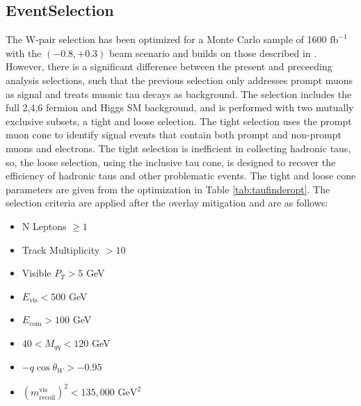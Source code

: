 \subsection{EventSelection}
\label{subsec:EventSelection}
The W-pair selection has been optimized for a Monte Carlo sample of 1600 $\text{fb}^{-1}$ with the $(-0.8,+0.3)$ beam scenario and builds on those described in \cite{ivan}. However, there is a significant difference between the present and preceeding analysis selections, such that  the previous selection only addresses prompt muons as signal and treats muonic tau decays as background. The selection includes the full 2,4,6 fermion and Higgs SM background, and is performed with two mutually exclusive subsets, a tight and loose selection. The tight selection uses the prompt muon cone to identify signal events that contain both prompt and non-prompt muons and electrons. The tight selection is inefficient in collecting hadronic taus, so, the loose selection, using the inclusive tau cone, is designed to recover the efficiency of hadronic taus and other problematic events. The tight and loose cone parameters are given from the optimization in Table \ref{tab:taufinderopt}. The selection criteria are applied after the overlay mitigation and are as follows:
\begin{itemize}
\item N Leptons $\geq 1$
\item Track Multiplicity $> 10$  
\item Visible $P_T > 5$ GeV  
\item $E_{\text{vis}} < 500$ GeV 
\item $E_{\text{com}} > 100$ GeV
\item $40<M_{qq}<120$ GeV
\item  $-q\cos\theta_W > -0.95$
\item  $(m^{\text{vis}}_{\text{recoil}})^2 < 135,000 \, \, \text{GeV}^2$
\end{itemize}

